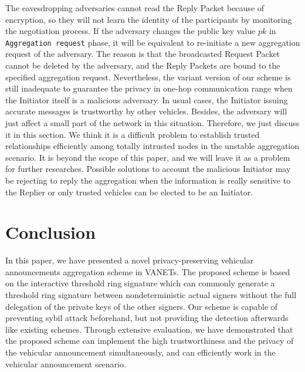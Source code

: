 \documentclass[a4paper]{article}
\begin{document}
The eavesdropping adversaries cannot read the Reply Packet because of encryption, so they will not learn the identity of the participants by monitoring the negotiation process. If the adversary changes the public key value $pk$ in \texttt{Aggregation request} phase, it will be equivalent to re-initiate a new aggregation request of the adversary. The reason is that the broadcasted Request Packet cannot be deleted by the adversary, and the Reply Packets are bound to the specified aggregation request. Nevertheless, the variant version of our scheme is still inadequate to guarantee the privacy in one-hop communication range when the Initiator itself is a malicious adversary. In usual cases, the Initiator issuing accurate messages is trustworthy by other vehicles. Besides, the adversary will just affect a small part of the network in this situation. Therefore, we just discuss it in this section. We think it is a difficult problem to establish trusted relationships efficiently among totally intrusted nodes in the unstable aggregation scenario. It is beyond the scope of this paper, and we will leave it as a problem for further researches. Possible solutions to account the malicious Initiator may be rejecting to reply the aggregation when the information is really sensitive to the Replier or only trusted vehicles can be elected to be an Initiator.

\section{Conclusion}
In this paper, we have presented a novel privacy-preserving vehicular announcements aggregation scheme in VANETs. The proposed scheme is based on the interactive threshold ring signature which can commonly generate a threshold ring signature between nondeterministic actual signers without the full delegation of the private keys of the other signers. Our scheme is capable of preventing sybil attack beforehand, but not providing the detection afterwards like existing schemes. Through extensive evaluation, we have demonstrated that the proposed scheme can implement the high trustworthiness and the privacy of the vehicular announcement simultaneously, and can efficiently work in the vehicular announcement scenario.
\end{document}
